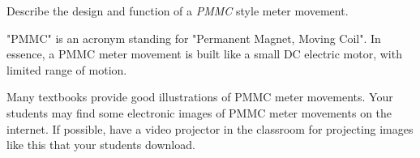 

Describe the design and function of a {\it PMMC} style meter movement.







"PMMC" is an acronym standing for "Permanent Magnet, Moving Coil".  In essence, a PMMC meter movement is built like a small DC electric motor, with limited range of motion.







Many textbooks provide good illustrations of PMMC meter movements.  Your students may find some electronic images of PMMC meter movements on the internet.  If possible, have a video projector in the classroom for projecting images like this that your students download.



